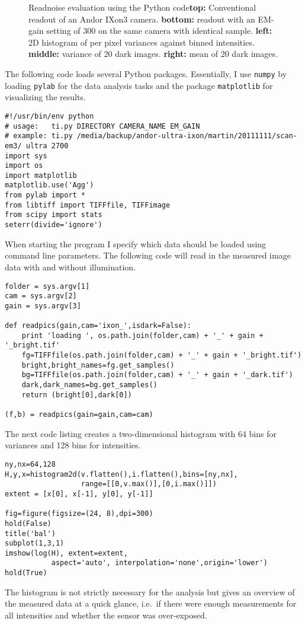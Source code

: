 \begin{figure}[htbp]
  \centering
  \caption{Readnoise evaluation using the Python code{\bf top:}
    Conventional readout of an Andor IXon3 camera. {\bf bottom:}
    readout with an EM-gain setting of 300 on the same camera with
    identical sample. {\bf left:} 2D histogram of per pixel variances
    against binned intensities. {\bf middle:} variance of 20 dark
    images. {\bf right:} mean of 20 dark images.}
  \label{fig:ixon}
\end{figure}
The following code loads several Python packages. Essentially, I use
\verb!numpy! by loading \verb!pylab! \citep{Jones} for the data
analysis tasks and the package \verb!matplotlib! \citep{Hunter:2007}
for visualizing the results.
\begin{lstlisting}[style=mypython]
#!/usr/bin/env python
# usage:   ti.py DIRECTORY CAMERA_NAME EM_GAIN
# example: ti.py /media/backup/andor-ultra-ixon/martin/20111111/scan-em3/ ultra 2700
import sys
import os
import matplotlib
matplotlib.use('Agg')
from pylab import *
from libtiff import TIFFfile, TIFFimage
from scipy import stats
seterr(divide='ignore')
\end{lstlisting}
When starting the program I specify which data should be loaded using
command line parameters. The following code will read in the measured
image data with and without illumination.
\begin{lstlisting}[style=mypython]
folder = sys.argv[1]
cam = sys.argv[2]
gain = sys.argv[3]

def readpics(gain,cam='ixon_',isdark=False):
    print 'loading ', os.path.join(folder,cam) + '_' + gain + '_bright.tif'
    fg=TIFFfile(os.path.join(folder,cam) + '_' + gain + '_bright.tif')
    bright,bright_names=fg.get_samples()
    bg=TIFFfile(os.path.join(folder,cam) + '_' + gain + '_dark.tif')    
    dark,dark_names=bg.get_samples()
    return (bright[0],dark[0])

(f,b) = readpics(gain=gain,cam=cam)
\end{lstlisting}
The next code listing creates a two-dimensional histogram with 64 bins
for variances and 128 bins for intensities.
\begin{lstlisting}[style=mypython]
ny,nx=64,128
H,y,x=histogram2d(v.flatten(),i.flatten(),bins=[ny,nx],
                  range=[[0,v.max()],[0,i.max()]])
extent = [x[0], x[-1], y[0], y[-1]] 

fig=figure(figsize=(24, 8),dpi=300)
hold(False)
title('bal')
subplot(1,3,1)
imshow(log(H), extent=extent,
           aspect='auto', interpolation='none',origin='lower')
hold(True)
\end{lstlisting}
The histogram is not strictly necessary for the analysis but gives an
overview of the measured data at a quick glance, i.e.\ if there were
enough measurements for all intensities and whether the sensor was
over-exposed.

